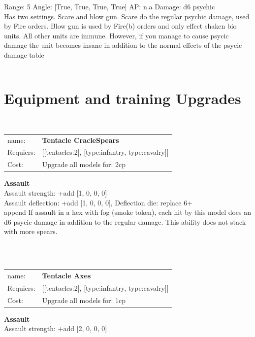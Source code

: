 Range: 5  Angle: [True, True, True, True] AP: n.a Damage: d6 psychic \\
Has two settings. Scare and blow gun. Scare do the regular psychic damage, used by Fire orders. Blow gun is used by Fire(b) orders and only effect shaken bio units. All other units are immune. However, if you manage to cause psycic damage the unit becomes insane in addition to the normal effects of the psycic damage table\\ 




 
\ \\

\section{Equipment and training Upgrades}\ \\
\begin{tabular}{ll}
name: & {\bf Tentacle CracleSpears } \\
Requiers: & [[tentacles:2], [type:infantry, type:cavalry]] \\
Cost: & Upgrade all models for: 2cp \\
\end{tabular}





{\bf Assault} \ \\
Assault strength: +add [1, 0, 0, 0] 
\\ 
Assault deflection: +add [1, 0, 0, 0], Deflection die: replace 6+
\\ 

append If assault in a hex with fog (smoke token), each hit by this model does an d6 psycic damage in addition to the regular damage. This ability does not stack with more spears.


\ \\
\ \\
\begin{tabular}{ll}
name: & {\bf Tentacle Axes } \\
Requiers: & [[tentacles:2], [type:infantry, type:cavalry]] \\
Cost: & Upgrade all models for: 1cp \\
\end{tabular}





{\bf Assault} \ \\
Assault strength: +add [2, 0, 0, 0] 
\\ 




